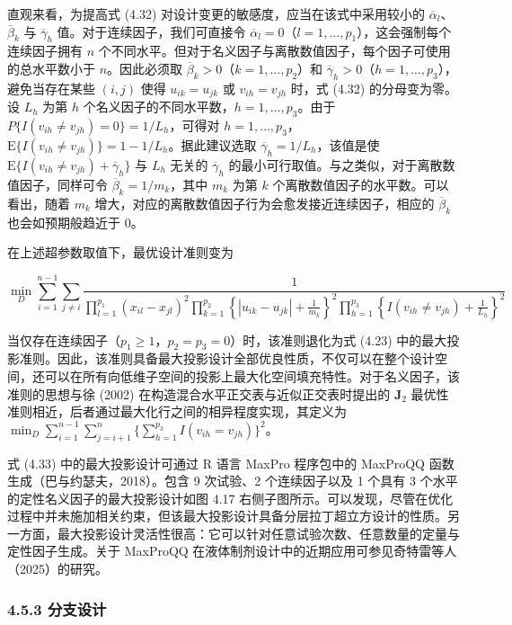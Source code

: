 \documentclass{ctexart}
\begin{document}
直观来看，为提高式 (4.32) 对设计变更的敏感度，应当在该式中采用较小的 $\overline{\alpha}_l$、$\overline{\beta}_k$ 与 $\overline{\gamma}_h$ 值。对于连续因子，我们可直接令 $\overline{\alpha}_l = 0$（$l=1,\dots,p_1$），这会强制每个连续因子拥有 $n$ 个不同水平。但对于名义因子与离散数值因子，每个因子可使用的总水平数小于 $n$。因此必须取 $\overline{\beta}_k > 0$（$k=1,\dots,p_2$）和 $\overline{\gamma}_h > 0$（$h=1,\dots,p_3$），避免当存在某些 $(i,j)$ 使得 $u_{ik}=u_{jk}$ 或 $v_{ih}=v_{jh}$ 时，式 (4.32) 的分母变为零。设 $L_h$ 为第 $h$ 个名义因子的不同水平数，$h=1,\dots,p_3$。由于 $P\{I(v_{ih} \neq v_{jh}) = 0\}=1/L_h$，可得对 $h=1,\dots,p_3$，$\mathrm{E}\{I(v_{ih} \neq v_{jh})\}=1-1/L_h$。据此建议选取 $\overline{\gamma}_h=1/L_h$，该值是使 $\mathrm{E}\{I(v_{ih} \neq v_{jh})+\overline{\gamma}_h\}$ 与 $L_h$ 无关的 $\overline{\gamma}_h$ 的最小可行取值。与之类似，对于离散数值因子，同样可令 $\overline{\beta}_k=1/m_k$，其中 $m_k$ 为第 $k$ 个离散数值因子的水平数。可以看出，随着 $m_k$ 增大，对应的离散数值因子行为会愈发接近连续因子，相应的 $\overline{\beta}_k$ 也会如预期般趋近于 0。

在上述超参数取值下，最优设计准则变为

\begin{equation*}
\min_{D}\sum_{i=1}^{n-1}\sum_{j\neq i}\frac{1}{\prod_{l=1}^{p_1}(x_{il}-x_{jl})^2\prod_{k=1}^{p_2}\left\{|u_{ik}-u_{jk}|+\frac{1}{m_k}\right\}^2\prod_{h=1}^{p_3}\left\{I(v_{ih}\neq v_{jh})+\frac{1}{L_h}\right\}^2}
\tag{4.33}
\end{equation*}

当仅存在连续因子（$p_1\ge 1$，$p_2=p_3=0$）时，该准则退化为式 (4.23) 中的最大投影准则。因此，该准则具备最大投影设计全部优良性质，不仅可以在整个设计空间，还可以在所有向低维子空间的投影上最大化空间填充特性。对于名义因子，该准则的思想与徐 (2002) 在构造混合水平正交表与近似正交表时提出的 $\boldsymbol{J}_2$ 最优性准则相近，后者通过最大化行之间的相异程度实现，其定义为 $\min_{D}\sum_{i=1}^{n-1}\sum_{j=i+1}^{n}\{\sum_{h=1}^{p_3}I(v_{ih}=v_{jh})\}^2$。

式 (4.33) 中的最大投影设计可通过 R 语言 MaxPro 程序包中的 MaxProQQ 函数生成（巴与约瑟夫，2018）。包含 9 次试验、2 个连续因子以及 1 个具有 3 个水平的定性名义因子的最大投影设计如图 4.17 右侧子图所示。可以发现，尽管在优化过程中并未施加相关约束，但该最大投影设计具备分层拉丁超立方设计的性质。另一方面，最大投影设计灵活性很高：它可以针对任意试验次数、任意数量的定量与定性因子生成。关于 MaxProQQ 在液体制剂设计中的近期应用可参见奇特雷等人（2025）的研究。

\subsubsection*{4.5.3 分支设计}
\end{document}
